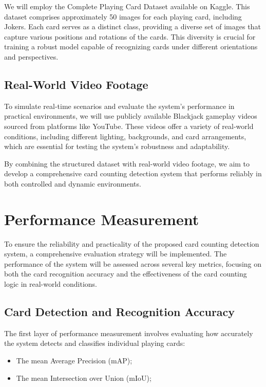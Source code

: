 \documentclass{article}
\begin{document}
We will employ the Complete Playing Card Dataset \cite{jay2020} available on Kaggle. This dataset comprises approximately 50 images for each playing card, including Jokers. Each card serves as a distinct class, providing a diverse set of images that capture various positions and rotations of the cards. This diversity is crucial for training a robust model capable of recognizing cards under different orientations and perspectives.

\subsection*{Real-World Video Footage}

To simulate real-time scenarios and evaluate the system's performance in practical environments, we will use publicly available Blackjack gameplay videos sourced from platforms like YouTube. These videos offer a variety of real-world conditions, including different lighting, backgrounds, and card arrangements, which are essential for testing the system's robustness and adaptability.

By combining the structured dataset with real-world video footage, we aim to develop a comprehensive card counting detection system that performs reliably in both controlled and dynamic environments.

\section*{Performance Measurement}

To ensure the reliability and practicality of the proposed card counting detection system, a comprehensive evaluation strategy will be implemented. The performance of the system will be assessed across several key metrics, focusing on both the card recognition accuracy and the effectiveness of the card counting logic in real-world conditions.

\subsection*{Card Detection and Recognition Accuracy}

The first layer of performance measurement involves evaluating how accurately the system detects and classifies individual playing cards:

\begin{itemize}
	\item The mean Average Precision (mAP);
	\item The mean Intersection over Union (mIoU);
\end{itemize}
\end{document}
